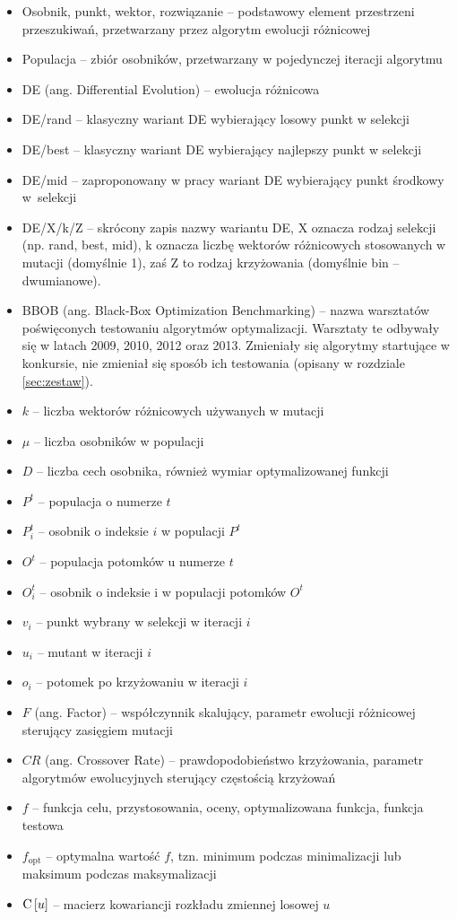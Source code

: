 \documentclass[a4paper,onecolumn,oneside,12pt,wide,floatssmall]{mwrep}
\def\C{{\rm C}\,}
\theoremstyle{definition}
\theoremstyle{plain}%
\theoremstyle{remark}
\begin{document}
\begin{itemize}
 \item[] Osobnik, punkt, wektor, rozwiązanie -- podstawowy element przestrzeni przeszukiwań, 
przetwarzany przez algorytm ewolucji różnicowej
 \item[] Populacja -- zbiór osobników, przetwarzany w pojedynczej iteracji algorytmu
 \item[] DE (ang. Differential Evolution) -- ewolucja różnicowa
 \item[] DE/rand -- klasyczny wariant DE wybierający losowy punkt w selekcji
 \item[] DE/best -- klasyczny wariant DE wybierający najlepszy punkt w selekcji
 \item[] DE/mid -- zaproponowany w pracy wariant DE wybierający punkt środkowy w~selekcji
 \item[] DE/X/k/Z -- skrócony zapis nazwy wariantu DE, X oznacza rodzaj selekcji (np. rand, best, mid), k oznacza liczbę wektorów różnicowych stosowanych
w mutacji (domyślnie 1), zaś Z to rodzaj krzyżowania (domyślnie bin -- dwumianowe).
 \item[] BBOB (ang. Black-Box Optimization Benchmarking) -- nazwa warsztatów poświęconych testowaniu algorytmów optymalizacji. 
Warsztaty te odbywały się w latach 2009, 2010, 2012 oraz 2013. Zmieniały się algorytmy startujące w konkursie, nie zmieniał
się sposób ich testowania (opisany w rozdziale \ref{sec:zestaw}).
 \item[] $k$ -- liczba wektorów różnicowych używanych w mutacji
 \item[] $\mu$ -- liczba osobników w populacji
 \item[] $D$ -- liczba cech osobnika, również wymiar optymalizowanej funkcji
 \item[] $P^t$ -- populacja o numerze $t$
 \item[] $P_i^t$ -- osobnik o indeksie $i$ w populacji $P^t$
 \item[] $O^t$ -- populacja potomków u numerze $t$
 \item[] $O_i^t$ -- osobnik o indeksie i w populacji potomków $O^t$
 \item[] $v_i$ -- punkt wybrany w selekcji w iteracji $i$
 \item[] $u_i$ -- mutant w iteracji $i$
 \item[] $o_i$ -- potomek po krzyżowaniu w iteracji $i$
 \item[] $F$ (ang. Factor) -- współczynnik skalujący, parametr ewolucji różnicowej sterujący zasięgiem mutacji
 \item[] $CR$ (ang. Crossover Rate) -- prawdopodobieństwo krzyżowania, parametr algorytmów ewolucyjnych sterujący częstością krzyżowań
 \item[] $f$ -- funkcja celu, przystosowania, oceny, optymalizowana funkcja, funkcja testowa
 \item[] $f_\text{opt}$ -- optymalna wartość $f$, tzn. minimum podczas minimalizacji lub maksimum podczas maksymalizacji
 \item[] $\C[u]$ -- macierz kowariancji rozkładu zmiennej losowej $u$
\end{itemize}
\end{document}
